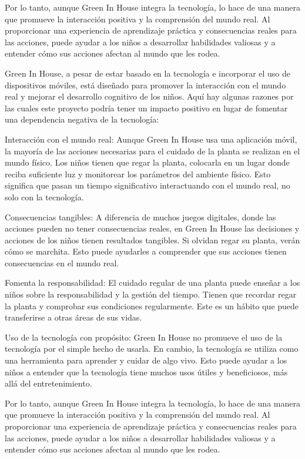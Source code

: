 Por lo tanto, aunque Green In House integra la tecnología, lo hace de una manera que promueve la interacción positiva y la comprensión del mundo real. Al proporcionar una experiencia de aprendizaje práctica y consecuencias reales para las acciones, puede ayudar a los niños a desarrollar habilidades valiosas y a entender cómo sus acciones afectan al mundo que les rodea.

Green In House, a pesar de estar basado en la tecnología e incorporar el uso de dispositivos móviles, está diseñado para promover la interacción con el mundo real y mejorar el desarrollo cognitivo de los niños. Aquí hay algunas razones por las cuales este proyecto podría tener un impacto positivo en lugar de fomentar una dependencia negativa de la tecnología:

Interacción con el mundo real: Aunque Green In House usa una aplicación móvil, la mayoría de las acciones necesarias para el cuidado de la planta se realizan en el mundo físico. Los niños tienen que regar la planta, colocarla en un lugar donde reciba suficiente luz y monitorear los parámetros del ambiente físico. Esto significa que pasan un tiempo significativo interactuando con el mundo real, no solo con la tecnología.

Consecuencias tangibles: A diferencia de muchos juegos digitales, donde las acciones pueden no tener consecuencias reales, en Green In House las decisiones y acciones de los niños tienen resultados tangibles. Si olvidan regar su planta, verán cómo se marchita. Esto puede ayudarles a comprender que sus acciones tienen consecuencias en el mundo real.

Fomenta la responsabilidad: El cuidado regular de una planta puede enseñar a los niños sobre la responsabilidad y la gestión del tiempo. Tienen que recordar regar la planta y comprobar sus condiciones regularmente. Este es un hábito que puede transferirse a otras áreas de sus vidas.

Uso de la tecnología con propósito: Green In House no promueve el uso de la tecnología por el simple hecho de usarla. En cambio, la tecnología se utiliza como una herramienta para aprender y cuidar de algo vivo. Esto puede ayudar a los niños a entender que la tecnología tiene muchos usos útiles y beneficiosos, más allá del entretenimiento.

Por lo tanto, aunque Green In House integra la tecnología, lo hace de una manera que promueve la interacción positiva y la comprensión del mundo real. Al proporcionar una experiencia de aprendizaje práctica y consecuencias reales para las acciones, puede ayudar a los niños a desarrollar habilidades valiosas y a entender cómo sus acciones afectan al mundo que les rodea.


